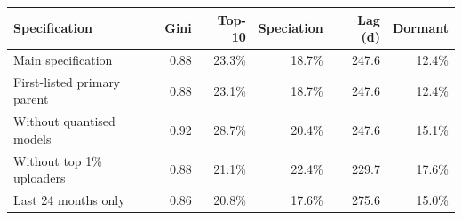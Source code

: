 \begin{tabular}{lrrrrr}
\toprule
Specification & Gini & Top-10 & Speciation & Lag (d) & Dormant \\
\midrule
Main specification & 0.88 & 23.3\% & 18.7\% & 247.6 & 12.4\% \\
First-listed primary parent & 0.88 & 23.1\% & 18.7\% & 247.6 & 12.4\% \\
Without quantised models & 0.92 & 28.7\% & 20.4\% & 247.6 & 15.1\% \\
Without top 1\% uploaders & 0.88 & 21.1\% & 22.4\% & 229.7 & 17.6\% \\
Last 24 months only & 0.86 & 20.8\% & 17.6\% & 275.6 & 15.0\% \\
\bottomrule
\end{tabular}
